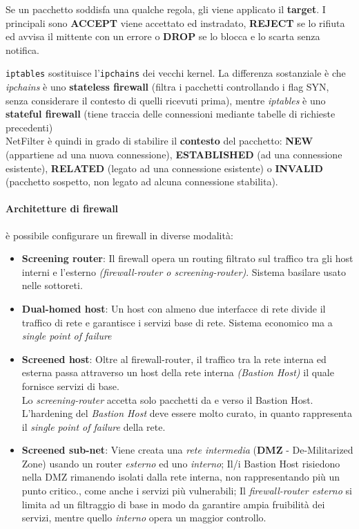 \documentclass[a4paper,11pt]{article}
\def\code#1{\texttt{#1}}
\begin{document}
Se un pacchetto soddisfa una qualche regola, gli viene applicato il \textbf{target}. I principali sono \textbf{ACCEPT} viene accettato ed instradato, \textbf{REJECT} se lo rifiuta ed avvisa il mittente con un errore o \textbf{DROP} se lo blocca e lo scarta senza notifica.

\code{iptables} sostituisce l'\code{ipchains} dei vecchi kernel. La differenza sostanziale è che \textit{ipchains} è uno \textbf{stateless firewall} (filtra i pacchetti controllando i flag SYN, senza considerare il contesto di quelli ricevuti prima), mentre \textit{iptables} è uno \textbf{stateful firewall} (tiene traccia delle connessioni mediante tabelle di richieste precedenti)\\
NetFilter è quindi in grado di stabilire il \textbf{contesto} del pacchetto: \textbf{NEW} (appartiene ad una nuova connessione), \textbf{ESTABLISHED} (ad una connessione esistente), \textbf{RELATED} (legato ad una connessione esistente) o \textbf{INVALID} (pacchetto sospetto, non legato ad alcuna connessione stabilita).

\paragraph{Architetture di firewall} è possibile configurare un firewall in diverse modalità:
\begin{itemize}
\item \textbf{Screening router}: Il firewall opera un routing filtrato sul traffico tra gli host interni e l'esterno \textit{(firewall-router o screening-router)}. Sistema basilare usato nelle sottoreti.
\item \textbf{Dual-homed host}: Un host con almeno due interfacce di rete divide il traffico di rete e garantisce i servizi base di rete. Sistema economico ma a \textit{single point of failure}
\item \textbf{Screened host}: Oltre al firewall-router, il traffico tra la rete interna ed esterna passa attraverso un host della rete interna \textit{(Bastion Host)} il quale fornisce servizi di base.\\ Lo \textit{screening-router} accetta solo pacchetti da e verso il Bastion Host. L'hardening del \textit{Bastion Host} deve essere molto curato, in quanto rappresenta il \textit{single point of failure} della rete.
\item \textbf{Screened sub-net}: Viene creata una \textit{rete intermedia} (\textbf{DMZ} - De-Militarized Zone) usando un router \textit{esterno} ed uno \textit{interno}; Il/i Bastion Host risiedono nella DMZ rimanendo isolati dalla rete interna, non rappresentando più un punto critico., come anche i servizi più vulnerabili; Il \textit{firewall-router esterno} si limita ad un filtraggio di base in modo da garantire ampia fruibilità dei servizi, mentre quello \textit{interno} opera un maggior controllo.
\end{itemize}






 
\end{document}
